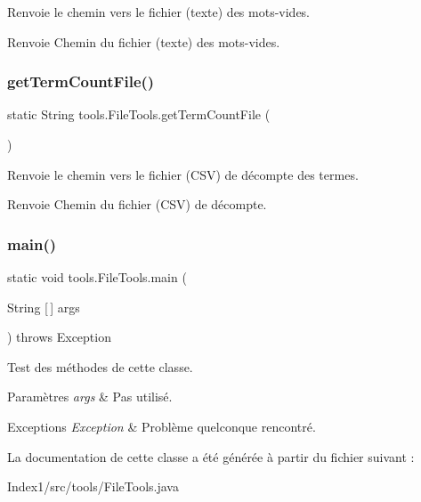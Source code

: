 Renvoie le chemin vers le fichier (texte) des mots-\/vides.

\begin{DoxyReturn}{Renvoie}
Chemin du fichier (texte) des mots-\/vides. 
\end{DoxyReturn}
\mbox{\label{classtools_1_1FileTools_a988c52caadc199f691faef3a30fd6dda}} 
\subsubsection{\texorpdfstring{get\+Term\+Count\+File()}{getTermCountFile()}}
{\footnotesize\ttfamily static String tools.\+File\+Tools.\+get\+Term\+Count\+File (\begin{DoxyParamCaption}{ }\end{DoxyParamCaption})\hspace{0.3cm}{\ttfamily [static]}}

Renvoie le chemin vers le fichier (C\+SV) de décompte des termes.

\begin{DoxyReturn}{Renvoie}
Chemin du fichier (C\+SV) de décompte. 
\end{DoxyReturn}
\mbox{\label{classtools_1_1FileTools_a4ca7adceaf54c47b855151d240150961}} 
\subsubsection{\texorpdfstring{main()}{main()}}
{\footnotesize\ttfamily static void tools.\+File\+Tools.\+main (\begin{DoxyParamCaption}\item[{String \mbox{[}$\,$\mbox{]}}]{args }\end{DoxyParamCaption}) throws Exception\hspace{0.3cm}{\ttfamily [static]}}

Test des méthodes de cette classe.


\begin{DoxyParams}{Paramètres}
{\em args} & Pas utilisé.\\
\hline
\end{DoxyParams}

\begin{DoxyExceptions}{Exceptions}
{\em Exception} & Problème quelconque rencontré. \\
\hline
\end{DoxyExceptions}


La documentation de cette classe a été générée à partir du fichier suivant \+:\begin{DoxyCompactItemize}
\item 
Index1/src/tools/File\+Tools.\+java\end{DoxyCompactItemize}
